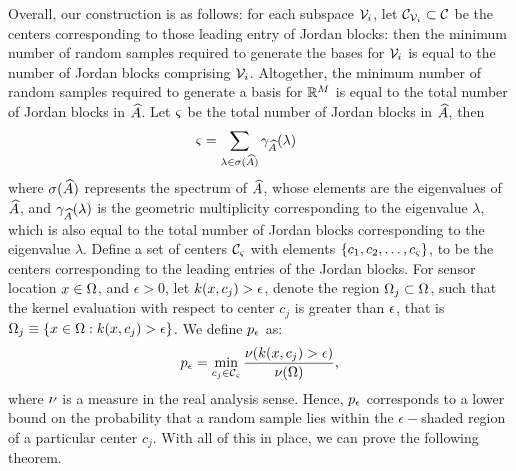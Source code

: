 Overall, our construction is as follows: for each subspace $ \mathcal{V}_i $, let $ \mathcal{C}_{\mathcal{V}_i} \subset \mathcal{C} $ be the centers corresponding to those leading entry of Jordan blocks: then the minimum number of random samples required to generate the bases for $ \mathcal{V}_i $ is equal to the number of Jordan blocks comprising $ \mathcal{V}_i $. Altogether, the minimum number of random samples required to generate a basis for $ \mathbb{R}^M $ is equal to the total number of Jordan blocks in $ \widehat{A} $. Let $ \varsigma $ be the total number of Jordan blocks in $ \widehat{A}  $, then
\begin{equation}\label{rands}
\rands = \sum_{\lambda \in \sigma(\dualopApprox)} \gamma_{\dualopApprox}(\lambda) \qquad %
\end{equation}
where $\sigma(\widehat{A}) $ represents the spectrum of $ \widehat{A} $, whose elements are the eigenvalues of $ \widehat{A} $, and $ \gamma_{\widehat{A}}(\lambda) $ is the geometric multiplicity corresponding to the eigenvalue $ \lambda $, which is also equal to the total number of Jordan blocks corresponding to the eigenvalue $ \lambda $. Define a set of centers $ \mathcal{C}_\varsigma $ with elements $ \{c_1, c_2,\dots, c_\varsigma\} $, to be the centers corresponding to the leading entries of  the Jordan blocks.
For sensor location $x\in\Omega$, and $ \epsilon > 0 $, let $k(x, c_j) > \epsilon$, denote the region $\Omega_j\subset\Omega$, such that the kernel evaluation with respect to center $c_j$ is greater than $\epsilon$, that is $ \Omega_j \equiv \{x\in \Omega:k(x, c_j) > \epsilon\} $. We define
$ p_{\epsilon} $ as:
\begin{equation}\label{ppp}
p_{\e} = \min_{c_j \in \shCent_\rands} \frac{\measure(\kernel(x, c_j) > \epsilon)}{\measure(\dom)},
\end{equation}
where $\nu$ is a measure in the real analysis sense. Hence, $p_{\epsilon}$ corresponds to a lower bound on the probability that a random sample lies within the $ \epsilon-$shaded region of a particular center $ c_j$. With all of this in place, we can prove the following theorem.

